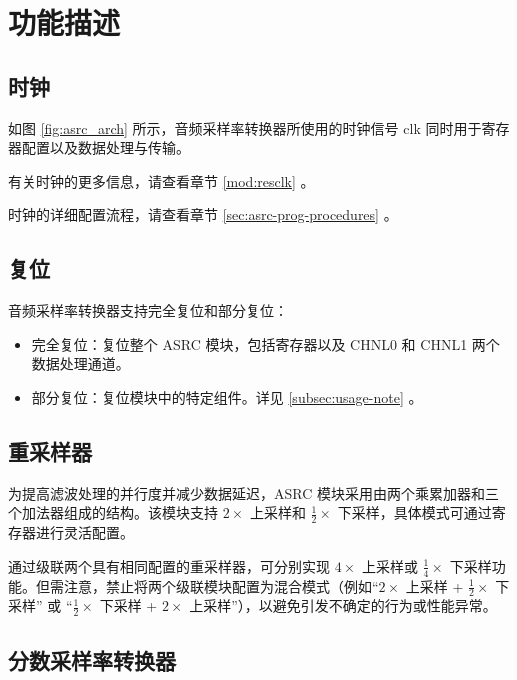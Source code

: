 \documentclass[main\_\_CN.tex]{subfiles}
\begin{document}

\section{功能描述}
\label{sec:asrc-func-descr}

\subsection{时钟}

如图 \ref{fig:asrc_arch} 所示，音频采样率转换器所使用的时钟信号 clk 同时用于寄存器配置以及数据处理与传输。

有关时钟的更多信息，请查看章节 \ref{mod:resclk} \textit{}。

时钟的详细配置流程，请查看章节 \ref{sec:asrc-prog-procedures} \textit{}。


\subsection{复位}

音频采样率转换器支持完全复位和部分复位：

\begin{itemize}
    \item 完全复位：复位整个 ASRC 模块，包括寄存器以及 CHNL0 和 CHNL1 两个数据处理通道。
    \item 部分复位：复位模块中的特定组件。详见 \ref{subsec:usage-note}  \textit{}。
\end{itemize}


\subsection{重采样器}

为提高滤波处理的并行度并减少数据延迟，ASRC 模块采用由两个乘累加器和三个加法器组成的结构。该模块支持 $2\times$ 上采样和 $\frac{1}{2}\times$ 下采样，具体模式可通过寄存器进行灵活配置。

通过级联两个具有相同配置的重采样器，可分别实现 $4\times$ 上采样或 $ \frac{1}{4} \times$ 下采样功能。但需注意，禁止将两个级联模块配置为混合模式（例如“$2\times$ 上采样 + $\frac{1}{2}\times$ 下采样” 或 “$\frac{1}{2}\times$ 下采样 + $2\times$ 上采样”），以避免引发不确定的行为或性能异常。


\subsection{分数采样率转换器}
\end{document}
